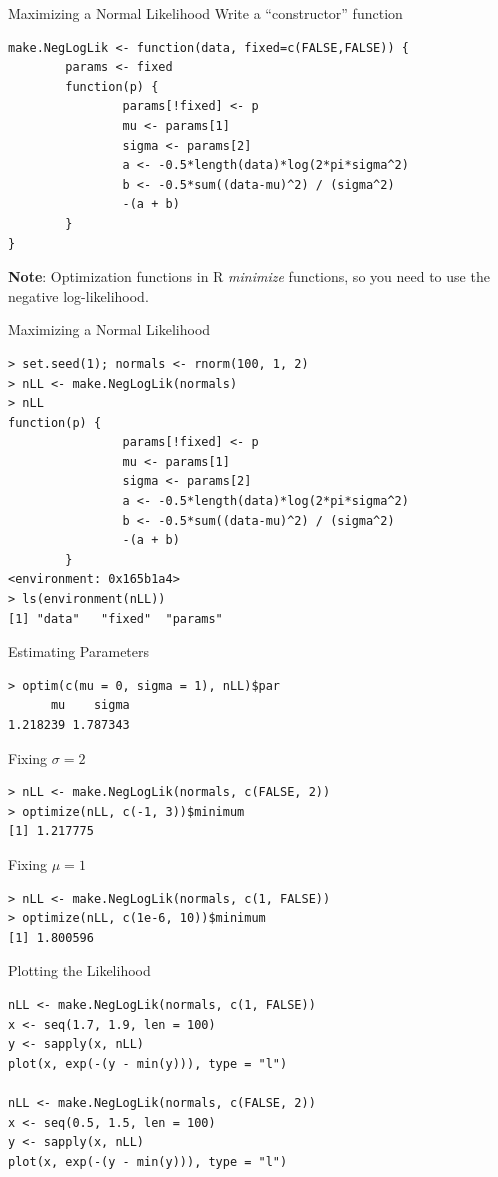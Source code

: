 \documentclass[aspectratio=169]{beamer}
\begin{document}
\begin{frame}[fragile]{Maximizing a Normal Likelihood}
Write a ``constructor'' function
\begin{verbatim}
make.NegLogLik <- function(data, fixed=c(FALSE,FALSE)) {
        params <- fixed
        function(p) {
                params[!fixed] <- p
                mu <- params[1]
                sigma <- params[2]
                a <- -0.5*length(data)*log(2*pi*sigma^2)
                b <- -0.5*sum((data-mu)^2) / (sigma^2)
                -(a + b)
        }
}
\end{verbatim}
\textbf{Note}: Optimization functions in R \textit{minimize}
functions, so you need to use the negative log-likelihood.
\end{frame}


\begin{frame}[fragile]{Maximizing a Normal Likelihood}
\begin{verbatim}
> set.seed(1); normals <- rnorm(100, 1, 2)
> nLL <- make.NegLogLik(normals)
> nLL
function(p) {
                params[!fixed] <- p
                mu <- params[1]
                sigma <- params[2]
                a <- -0.5*length(data)*log(2*pi*sigma^2)
                b <- -0.5*sum((data-mu)^2) / (sigma^2)
                -(a + b)
        }
<environment: 0x165b1a4>
> ls(environment(nLL))
[1] "data"   "fixed"  "params"
\end{verbatim}
\end{frame}

\begin{frame}[fragile]{Estimating Parameters}
\begin{verbatim}
> optim(c(mu = 0, sigma = 1), nLL)$par
      mu    sigma 
1.218239 1.787343 
\end{verbatim}
Fixing $\sigma = 2$
\begin{verbatim}
> nLL <- make.NegLogLik(normals, c(FALSE, 2))
> optimize(nLL, c(-1, 3))$minimum
[1] 1.217775
\end{verbatim}
Fixing $\mu = 1$
\begin{verbatim}
> nLL <- make.NegLogLik(normals, c(1, FALSE))
> optimize(nLL, c(1e-6, 10))$minimum
[1] 1.800596
\end{verbatim}
\end{frame}

\begin{frame}[fragile]{Plotting the Likelihood}
\begin{verbatim}
nLL <- make.NegLogLik(normals, c(1, FALSE))
x <- seq(1.7, 1.9, len = 100)
y <- sapply(x, nLL)
plot(x, exp(-(y - min(y))), type = "l")

nLL <- make.NegLogLik(normals, c(FALSE, 2))
x <- seq(0.5, 1.5, len = 100)
y <- sapply(x, nLL)
plot(x, exp(-(y - min(y))), type = "l")
\end{verbatim}
\end{frame}
\end{document}
